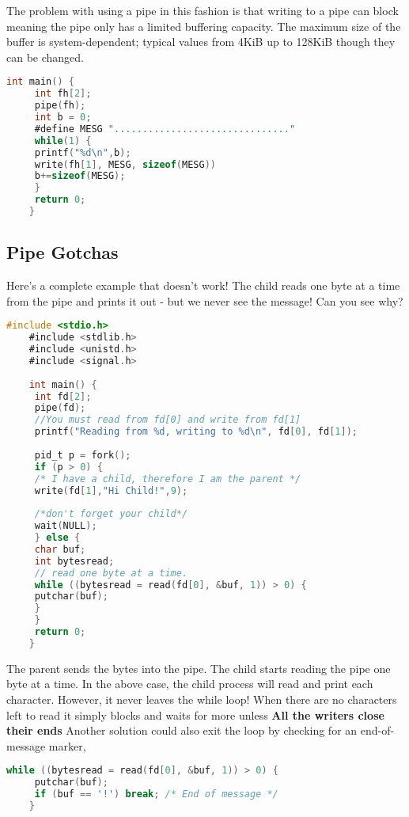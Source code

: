 	The problem with using a pipe in this fashion is that writing to a pipe can block meaning the pipe only has a limited buffering capacity.
	The maximum size of the buffer is system-dependent; typical values from 4KiB up to 128KiB though they can be changed.
	 
	\begin{lstlisting}[language=C]
	int main() {
	 int fh[2];
	 pipe(fh);
	 int b = 0;
	 #define MESG "..............................."
	 while(1) {
	 printf("%d\n",b);
	 write(fh[1], MESG, sizeof(MESG))
	 b+=sizeof(MESG);
	 }
	 return 0;
	}
	\end{lstlisting}
	 
	\subsection{Pipe Gotchas}
	 
	Here's a complete example that doesn't work!
	The child reads one byte at a time from the pipe and prints it out - but we never see the message!
	Can you see why?
	 
	\begin{lstlisting}[language=C]
	#include <stdio.h>
	#include <stdlib.h>
	#include <unistd.h>
	#include <signal.h>
	 
	int main() {
	 int fd[2];
	 pipe(fd);
	 //You must read from fd[0] and write from fd[1]
	 printf("Reading from %d, writing to %d\n", fd[0], fd[1]);
	 
	 pid_t p = fork();
	 if (p > 0) {
	 /* I have a child, therefore I am the parent */
	 write(fd[1],"Hi Child!",9);
	 
	 /*don't forget your child*/
	 wait(NULL);
	 } else {
	 char buf;
	 int bytesread;
	 // read one byte at a time.
	 while ((bytesread = read(fd[0], &buf, 1)) > 0) {
	 putchar(buf);
	 }
	 }
	 return 0;
	}
	\end{lstlisting}
	 
	The parent sends the bytes  into the pipe.
	The child starts reading the pipe one byte at a time.
	In the above case, the child process will read and print each character.
	However, it never leaves the while loop!
	When there are no characters left to read it simply blocks and waits for more unless \textbf{All the writers close their ends}
	Another solution could also exit the loop by checking for an end-of-message marker,
	 
	\begin{lstlisting}[language=C]
	while ((bytesread = read(fd[0], &buf, 1)) > 0) {
	 putchar(buf);
	 if (buf == '!') break; /* End of message */
	}
	\end{lstlisting}
	 
